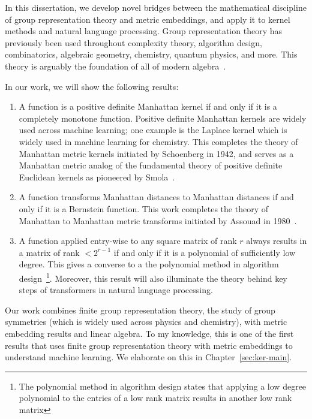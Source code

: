   In this dissertation, we develop novel bridges between the
  mathematical discipline of group representation theory and metric
  embeddings, and apply it
  to kernel methods and natural language processing.  Group
  representation theory has previously been used throughout complexity theory, algorithm design,
  combinatorics, algebraic geometry, chemistry, quantum physics, and
  more. This theory is arguably the foundation of all of modern
  algebra~\cite{FH91, etingof}.

  In our work, we will show the following results:
\begin{enumerate}
    \item A function is a positive definite Manhattan kernel if and only
    if it is a completely monotone function. Positive definite Manhattan kernels are widely
    used across machine learning; one example is the Laplace kernel
    which is widely used in machine learning for chemistry. This
    completes the theory of Manhattan metric kernels initiated by
    Schoenberg in 1942, and serves as a Manhattan metric analog of the
    fundamental theory of positive definite Euclidean kernels as pioneered by
    Smola~\cite{s96, sow01, ss01}.
    \item A function transforms Manhattan distances to Manhattan
    distances if and only if it is a Bernstein function. This work
    completes the theory of Manhattan to Manhattan metric transforms
    initiated by Assouad in 1980~\cite{a80}.
    \item A function applied entry-wise to any square matrix of rank $r$
    always results in a matrix of rank  $< 2^{r-1}$ if and only if it is
    a polynomial of sufficiently low degree. This gives a converse to a
    the polynomial method in algorithm design~\footnote{The polynomial
      method in algorithm design states that applying a low degree
        polynomial to the entries of a low rank matrix results in
        another low rank matrix}.
    Moreover, this result will also illuminate the theory behind key steps of
    transformers in natural language processing.
\end{enumerate} 

Our work combines finite group representation theory, the study of group
symmetries (which is widely used across physics and chemistry), with
metric embedding results and linear algebra. To my knowledge, this is
one of the first results that uses finite group representation theory
with metric embeddings to understand machine learning. We elaborate on
this in Chapter~\ref{sec:ker-main}.

